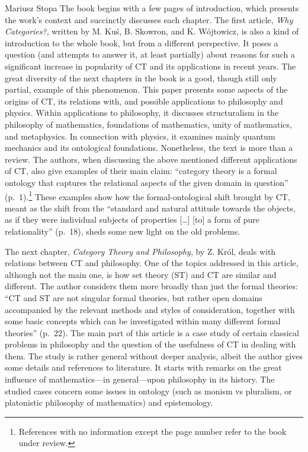 \begin{recengenv}{Mariusz Stopa}
The book begins with a few pages of introduction, which presents the work's context and succinctly discusses each chapter. The first article, \textit{Why Cat\-e\-gories?}, written by M. Kuś, B. Skowron, and K. Wójtowicz, is also a kind of introduction to the whole book, but from a different perspective. It poses a question (and attempts to answer it, at least partially) about reasons for such a significant increase in popularity of CT and its applications in recent years. The great diversity of the next chapters in the book is a good, though still only partial, example of this phenomenon. This paper presents some aspects of the origins of CT, its relations with, and possible applications to philosophy and physics. Within applications to philosophy, it discusses structuralism in the philosophy of mathematics, foundations of mathematics, unity of mathematics, and metaphysics. In connection with physics, it examines mainly quantum mechanics and its ontological foundations. Nonetheless, the text is more than a review. The authors, when discussing the above mentioned different applications of CT, also give examples of their main claim: ``cat\-e\-go\-ry theory is a formal ontology that captures the relational aspects of the given domain in question'' (p.~1).\footnote{References with no information except the page number refer to the book under review.} These examples show how the formal-ontological shift brought by CT, meant as the shift from the ``standard and natural attitude towards the objects, as if they were individual subjects of properties [\ldots] [to] a form of pure relationality'' (p.~18), sheds some new light on the old problems.


The next chapter, \textit{Category Theory and Philosophy}, by Z. Król, deals with relations between CT and philosophy. One of the topics addressed in this article, although not the main one, is how set theory (ST) and CT are similar and different. The author considers them more broadly than just the formal theories: ``CT and ST are not singular formal theories, but rather open domains accompanied by the relevant methods and styles of consideration, together with some basic concepts which can be investigated within many different formal theories'' (p.~22). The main part of this article is a case study of certain classical problems in philosophy and the question of the usefulness of CT in dealing with them. The study is rather general without deeper analysis, albeit the author gives some details and references to literature. It starts with remarks on the great influence of mathematics---in general---upon philosophy in its history. The studied cases concern some issues in ontology (such as monism vs pluralism, or platonistic philosophy of mathematics) and epistemology.


\end{recengenv}
